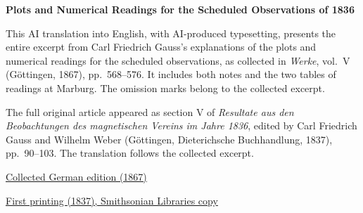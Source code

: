 \clearpage
\thispagestyle{empty}
\begin{center}\Large\textbf{Plots and Numerical Readings for the Scheduled Observations of 1836}\end{center}

This AI translation into English, with AI-produced typesetting, presents the entire excerpt from Carl Friedrich Gauss’s explanations of the plots and numerical readings for the scheduled observations, as collected in \textit{Werke}, vol.~V (Göttingen, 1867), pp.~568--576. It includes both notes and the two tables of readings at Marburg. The omission marks belong to the collected excerpt.

The full original article appeared as section V of \textit{Resultate aus den Beobachtungen des magnetischen Vereins im Jahre 1836}, edited by Carl Friedrich Gauss and Wilhelm Weber (Göttingen, Dieterichsche Buchhandlung, 1837), pp.~90--103. The translation follows the collected excerpt.

\medskip\noindent
\href{https://gdz.sub.uni-goettingen.de/id/PPN236006339}{Collected German edition (1867)}\par
\noindent\href{https://archive.org/details/ResultateausdenBd1Gaus/page/n95/mode/2up}{First printing (1837), Smithsonian Libraries copy}
\clearpage

